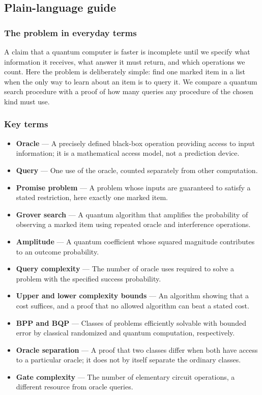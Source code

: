 \documentclass[
  11pt,
]{article}
\begin{document}
\subsection{Plain-language guide}

\subsubsection{The problem in everyday terms}

A claim that a quantum computer is faster is incomplete until we specify
what information it receives, what answer it must return, and which
operations we count. Here the problem is deliberately simple: find one
marked item in a list when the only way to learn about an item is to
query it. We compare a quantum search procedure with a proof of how many
queries any procedure of the chosen kind must use.

\subsubsection{Key terms}

\begin{itemize}
\item
  \textbf{Oracle} --- A precisely defined black-box operation providing
  access to input information; it is a mathematical access model, not a
  prediction device.
\item
  \textbf{Query} --- One use of the oracle, counted separately from
  other computation.
\item
  \textbf{Promise problem} --- A problem whose inputs are guaranteed to
  satisfy a stated restriction, here exactly one marked item.
\item
  \textbf{Grover search} --- A quantum algorithm that amplifies the
  probability of observing a marked item using repeated oracle and
  interference operations.
\item
  \textbf{Amplitude} --- A quantum coefficient whose squared magnitude
  contributes to an outcome probability.
\item
  \textbf{Query complexity} --- The number of oracle uses required to
  solve a problem with the specified success probability.
\item
  \textbf{Upper and lower complexity bounds} --- An algorithm showing
  that a cost suffices, and a proof that no allowed algorithm can beat a
  stated cost.
\item
  \textbf{BPP and BQP} --- Classes of problems efficiently solvable with
  bounded error by classical randomized and quantum computation,
  respectively.
\item
  \textbf{Oracle separation} --- A proof that two classes differ when
  both have access to a particular oracle; it does not by itself
  separate the ordinary classes.
\item
  \textbf{Gate complexity} --- The number of elementary circuit
  operations, a different resource from oracle queries.
\end{itemize}
\end{document}
